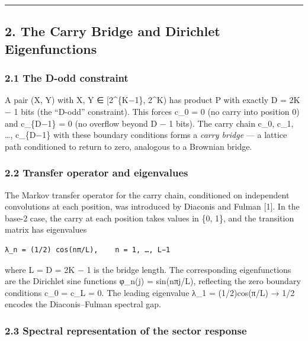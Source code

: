 \documentclass[
  11pt,
]{article}
\begin{document}
\begin{center}\rule{0.5\linewidth}{0.5pt}\end{center}

\newpage

\subsection{2. The Carry Bridge and Dirichlet
Eigenfunctions}\label{the-carry-bridge-and-dirichlet-eigenfunctions}

\subsubsection{2.1 The D-odd constraint}\label{the-d-odd-constraint}

A pair (X, Y) with X, Y ∈ {[}2\^{}\{K−1\}, 2\^{}K) has product P with exactly D
= 2K − 1 bits (the ``D-odd'' constraint). This forces c\_0 = 0 (no carry into
position 0) and c\_\{D−1\} = 0 (no overflow beyond D − 1 bits). The carry chain
c\_0, c\_1, \ldots, c\_\{D−1\} with these boundary conditions forms a
\emph{carry bridge} --- a lattice path conditioned to return to zero, analogous
to a Brownian bridge.

\subsubsection{2.2 Transfer operator and
eigenvalues}\label{transfer-operator-and-eigenvalues}

The Markov transfer operator for the carry chain, conditioned on independent
convolutions at each position, was introduced by Diaconis and Fulman {[}1{]}. In
the base-2 case, the carry at each position takes values in \{0, 1\}, and the
transition matrix has eigenvalues

\begin{verbatim}
λ_n = (1/2) cos(nπ/L),    n = 1, …, L−1
\end{verbatim}

where L = D = 2K − 1 is the bridge length. The corresponding eigenfunctions are
the Dirichlet sine functions φ\_n(j) = sin(nπj/L), reflecting the zero boundary
conditions c\_0 = c\_L = 0. The leading eigenvalue λ\_1 = (1/2)cos(π/L) → 1/2
encodes the Diaconis--Fulman spectral gap.

\subsubsection{2.3 Spectral representation of the sector
response}\label{spectral-representation-of-the-sector-response}
\end{document}
